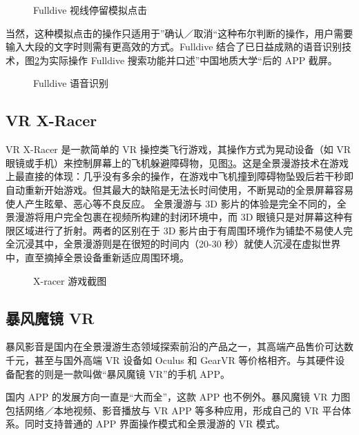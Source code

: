 \begin{figure}[htp]
\centering
{}
\caption{Fulldive 视线停留模拟点击}
\label{fig:fulldive3}
\end{figure}

当然，这种模拟点击的操作只适用于”确认／取消“这种布尔判断的操作，用户需要输入大段的文字时则需有更高效的方式。Fulldive 结合了已日益成熟的语音识别技术，图\ref{fig:fulldive4}为实际操作 Fulldive 搜索功能并口述”中国地质大学“后的 APP 截屏。

\begin{figure}[htp]
\centering
{}
\caption{Fulldive 语音识别}
\label{fig:fulldive4}
\end{figure}

\subsection{VR X-Racer}

VR X-Racer 是一款简单的 VR 操控类飞行游戏，其操作方式为晃动设备（如 VR 眼镜或手机）来控制屏幕上的飞机躲避障碍物，见图\ref{fig:x-racer}。这是全景漫游技术在游戏上最直接的体现：几乎没有多余的操作，在游戏中飞机撞到障碍物坠毁后若干秒即自动重新开始游戏。但其最大的缺陷是无法长时间使用，不断晃动的全景屏幕容易使人产生眩晕、恶心等不良反应。
全景漫游与 3D 影片的体验是完全不同的，全景漫游将用户完全包裹在视频所构建的封闭环境中，而 3D 眼镜只是对屏幕这种有限区域进行了折射。两者的区别在于 3D 影片由于有周围环境作为铺垫不易使人完全沉浸其中，全景漫游则是在很短的时间内（20-30 秒）就使人沉浸在虚拟世界中，直至摘掉全景设备重新适应周围环境。

\begin{figure}[htp]
\centering
{}
\caption{X-racer 游戏截图}
\label{fig:x-racer}
\end{figure}

\subsection{暴风魔镜 VR}

暴风影音是国内在全景漫游生态领域探索前沿的产品之一，其高端产品售价可达数千元，甚至与国外高端 VR 设备如 Oculus 和 GearVR 等价格相齐。与其硬件设备配套的则是一款叫做“暴风魔镜 VR”的手机 APP。

国内 APP 的发展方向一直是“大而全”，这款 APP 也不例外。暴风魔镜 VR 力图包括网络／本地视频、影音播放与 VR APP 等多种应用，形成自己的 VR 平台体系。同时支持普通的 APP 界面操作模式和全景漫游的 VR 模式。

